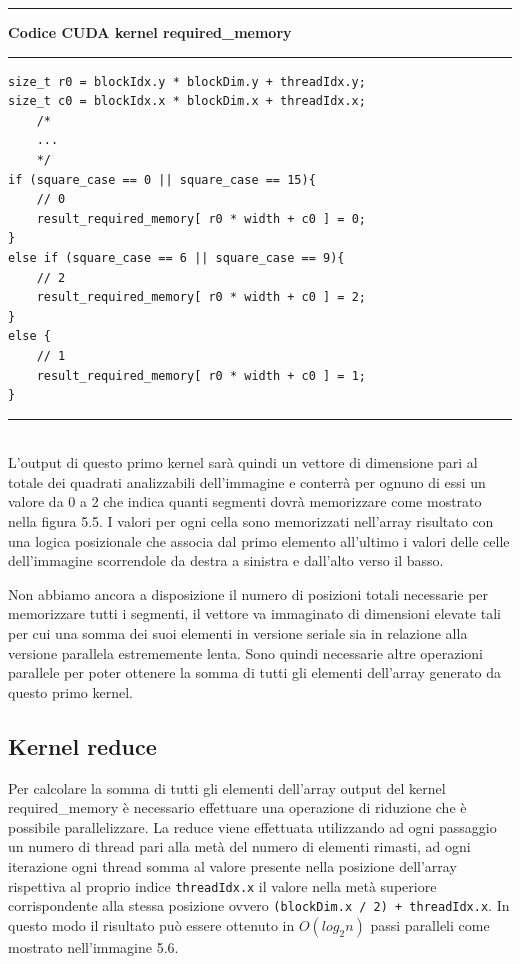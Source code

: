 \documentclass[12pt,a4paper]{report}
\begin{document}
\noindent\rule[0.5ex]{\linewidth}{2pt}
\small{\textbf{Codice CUDA kernel required\_memory}} \\
\noindent\rule[0.5ex]{\linewidth}{1pt}
\begin{lstlisting}
size_t r0 = blockIdx.y * blockDim.y + threadIdx.y;
size_t c0 = blockIdx.x * blockDim.x + threadIdx.x;
    /*
    ...
    */
if (square_case == 0 || square_case == 15){
    // 0
    result_required_memory[ r0 * width + c0 ] = 0;
}
else if (square_case == 6 || square_case == 9){
    // 2
    result_required_memory[ r0 * width + c0 ] = 2;
}
else {
    // 1
    result_required_memory[ r0 * width + c0 ] = 1;
}  
\end{lstlisting}
\noindent\rule[0.5ex]{\linewidth}{1pt} \\[10pt]
\newpage
L'output di questo primo kernel sarà quindi un vettore di dimensione pari al totale dei quadrati analizzabili dell'immagine e conterrà per ognuno di essi un valore da 0 a 2 che indica quanti segmenti dovrà memorizzare come mostrato nella figura 5.5. I valori per ogni cella sono memorizzati nell'array risultato con una logica posizionale che associa dal primo elemento all'ultimo i valori delle celle dell'immagine scorrendole da destra a sinistra e dall'alto verso il basso.
\begin{figure}[H]
\centering
\begin{floatrow}[1]
\end{floatrow}
\end{figure} 
Non abbiamo ancora a disposizione il numero di posizioni totali necessarie per memorizzare tutti i segmenti, il vettore va immaginato di dimensioni elevate tali per cui una somma dei suoi elementi in versione seriale sia in relazione alla versione parallela estrememente lenta. Sono quindi necessarie altre operazioni parallele per poter ottenere la somma di tutti gli elementi dell'array generato da questo primo kernel. \newpage

\subsection{Kernel reduce}
Per calcolare la somma di tutti gli elementi dell'array output del kernel required\_memory è necessario effettuare una operazione di riduzione che è possibile parallelizzare. \newline
La reduce viene effettuata utilizzando ad ogni passaggio un numero di thread pari alla metà del numero di elementi rimasti, ad ogni iterazione ogni thread somma al valore presente nella posizione dell'array rispettiva al proprio indice \verb|threadIdx.x| il valore nella metà superiore corrispondente alla stessa posizione ovvero \verb|(blockDim.x / 2) + threadIdx.x|. \newline In questo modo il risultato può essere ottenuto in \(O(log_2 n)\) passi paralleli come mostrato nell'immagine 5.6.
\end{document}

